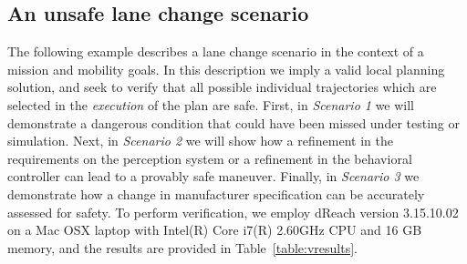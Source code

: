 \subsection{An unsafe lane change scenario}
The following example describes a lane change scenario in the context of a mission and mobility goals. In this description we imply a valid local planning solution, and seek to verify that all possible individual trajectories which are selected in the \emph{execution} of the plan are safe. First, in \emph{Scenario 1} we will demonstrate a dangerous condition that could have been missed under testing or simulation. Next, in \emph{Scenario 2} we will show how a refinement in the requirements on the perception system or a refinement in the behavioral controller can lead to a provably safe maneuver. Finally, in \emph{Scenario 3} we demonstrate how a change in manufacturer specification can be accurately assessed for safety. To perform verification, we employ dReach version 3.15.10.02 on a Mac OSX laptop with Intel(R) Core i7(R)  2.60GHz CPU and 16 GB memory, and the results are provided in Table~\ref{table:vresults}.


